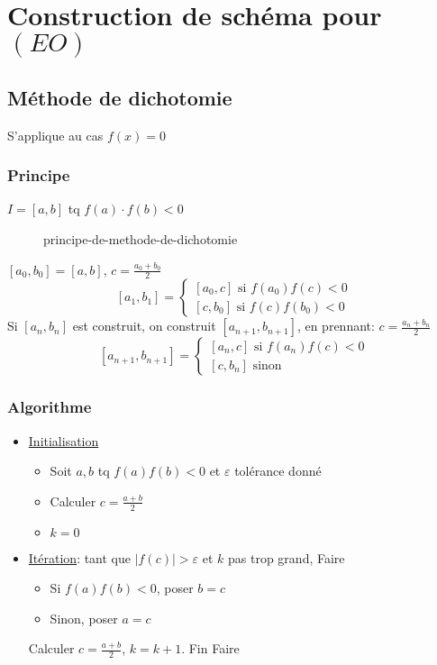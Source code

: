 \section{Construction de schéma pour $(EO)$}
\subsection{Méthode de dichotomie}
S'applique au cas $f(x) = 0$
\subsubsection*{Principe}
$I = [a, b]$ tq  $f(a)\cdot f(b) < 0$
\begin{figure}[H]
    \centering
    \caption{principe-de-methode-de-dichotomie}
    \label{fig:principe-de-methode-de-dichotomie}
\end{figure}
$[a_0, b_0] = [a, b]$, $c = \frac{a_0 + b_0}{2}$ 
\[
    [a_1, b_1] = \begin{cases}
        [a_0, c] \text{ si } f(a_0)f(c) < 0\\
        [c, b_0] \text{ si } f(c)f(b_0) < 0
    \end{cases}
\] 
Si $[a_n, b_n]$ est construit, on construit  $[a_{n+1}, b_{n+1}]$, en prennant: $c = \frac{a_n + b_n}{2}$ 
\[
    [a_{n+1}, b_{n+1}] = \begin{cases}
        [a_n, c] \text{ si } f(a_n)f(c) < 0\\
        [c, b_n] \text{ sinon }
    \end{cases}
\] 
\subsubsection*{Algorithme}
\begin{itemize}
    \item \underline{Initialisation}
        \begin{itemize}
            \item Soit $a, b$ tq  $f(a)f(b) < 0$ et  $\varepsilon$ tolérance donné
            \item Calculer  $c = \frac{a + b}{2}$ 
            \item $k = 0$
        \end{itemize}
    \item \underline{Itération}: tant que $|f(c)| > \varepsilon$ et  $k$ pas trop grand, Faire
         \begin{itemize}
            \item Si $f(a)f(b) < 0$,  poser  $b = c$
            \item Sinon, poser  $a = c$
        \end{itemize}
        Calculer $c = \frac{a + b}{2}$, $k = k+1$. Fin Faire
\end{itemize}
